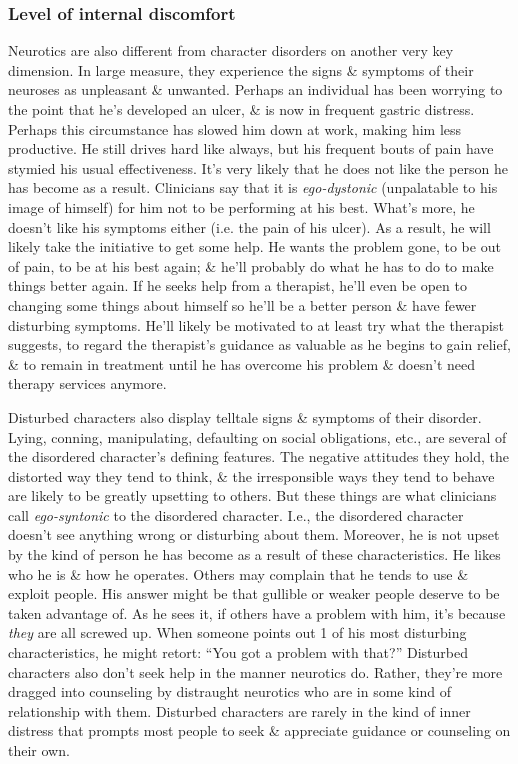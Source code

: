 \documentclass{article}
\numberwithin{equation}{section}
\begin{document}
\subsubsection{Level of internal discomfort}
Neurotics are also different from character disorders on another very key dimension. In large measure, they experience the signs \& symptoms of their neuroses as unpleasant \& unwanted. Perhaps an individual has been worrying to the point that he's developed an ulcer, \& is now in frequent gastric distress. Perhaps this circumstance has slowed him down at work, making him less productive. He still drives hard like always, but his frequent bouts of pain have stymied his usual effectiveness. It's very likely that he does not like the person he has become as a result. Clinicians say that it is \textit{ego-dystonic} (unpalatable to his image of himself) for him not to be performing at his best. What's more, he doesn't like his symptoms either (i.e. the pain of his ulcer). As a result, he will likely take the initiative to get some help. He wants the problem gone, to be out of pain, to be at his best again; \& he'll probably do what he has to do to make things better again. If he seeks help from a therapist, he'll even be open to changing some things about himself so he'll be a better person \& have fewer disturbing symptoms. He'll likely be motivated to at least try what the therapist suggests, to regard the therapist's guidance as valuable as he begins to gain relief, \& to remain in treatment until he has overcome his problem \& doesn't need therapy services anymore.

Disturbed characters also display telltale signs \& symptoms of their disorder. Lying, conning, manipulating, defaulting on social obligations, etc., are several of the disordered character's defining features. The negative attitudes they hold, the distorted way they tend to think, \& the irresponsible ways they tend to behave are likely to be greatly upsetting to others. But these things are what clinicians call \textit{ego-syntonic} to the disordered character. I.e., the disordered character doesn't see anything wrong or disturbing about them. Moreover, he is not upset by the kind of person he has become as a result of these characteristics. He likes who he is \& how he operates. Others may complain that he tends to use \& exploit people. His answer might be that gullible or weaker people deserve to be taken advantage of. As he sees it, if others have a problem with him, it's because \textit{they} are all screwed up. When someone points out 1 of his most disturbing characteristics, he might retort: ``You got a problem with that?'' Disturbed characters also don't seek help in the manner neurotics do. Rather, they're more dragged into counseling by distraught neurotics who are in some kind of relationship with them. Disturbed characters are rarely in the kind of inner distress that prompts most people to seek \& appreciate guidance or counseling on their own.
\end{document}
